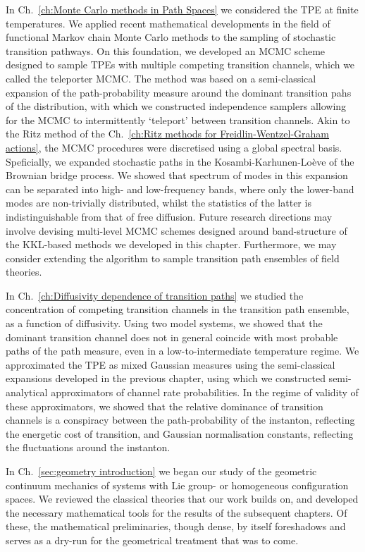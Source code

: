 \documentclass[]{cam-thesis}
\begin{document}
In Ch.~\ref{ch:Monte Carlo methods in Path Spaces} we considered the TPE at finite temperatures. We applied recent mathematical developments in the field of functional Markov chain Monte Carlo methods to the sampling of stochastic transition pathways. On this foundation, we developed an MCMC scheme designed to sample TPEs with multiple competing transition channels, which we called the teleporter MCMC. The method was based on a semi-classical expansion of the path-probability measure around the dominant transition pahs of the distribution, with which we constructed independence samplers allowing for the MCMC to intermittently `teleport' between transition channels. Akin to the Ritz method of the Ch.~\ref{ch:Ritz methods for Freidlin-Wentzel-Graham actions}, the MCMC procedures were discretised using a global spectral basis. Speficially, we expanded stochastic paths in the Kosambi-Karhunen-Lo\`eve of the Brownian bridge process. We showed that spectrum of modes in this expansion can be separated into high- and low-frequency bands, where only the lower-band modes are non-trivially distributed, whilst the statistics of the latter is indistinguishable from that of free diffusion. Future research directions may involve devising multi-level MCMC schemes designed around band-structure of the KKL-based methods we developed in this chapter. Furthermore, we may consider extending the algorithm to sample transition path ensembles of field theories. 

In Ch.~\ref{ch:Diffusivity dependence of transition paths} we studied the concentration of competing transition channels in the transition path ensemble, as a function of diffusivity. Using two model systems, we showed that the dominant transition channel does not in general coincide with most probable paths of the path measure, even in a low-to-intermediate temperature regime. We approximated the TPE as mixed Gaussian measures using the semi-classical expansions developed in the previous chapter, using which we constructed semi-analytical approximators of channel rate probabilities. In the regime of validity of these approximators, we showed that the relative dominance of transition channels is a conspiracy between the path-probability of the instanton, reflecting the energetic cost of transition, and Gaussian normalisation constants, reflecting the fluctuations around the instanton.

In Ch.~\ref{sec:geometry introduction} we began our study of the geometric continuum mechanics of systems with Lie group- or homogeneous configuration spaces. We reviewed the classical theories that our work builds on, and developed the necessary mathematical tools for the results of the subsequent chapters. Of these, the mathematical preliminaries, though dense, by itself foreshadows and serves as a dry-run for the geometrical treatment that was to come.
\end{document}
